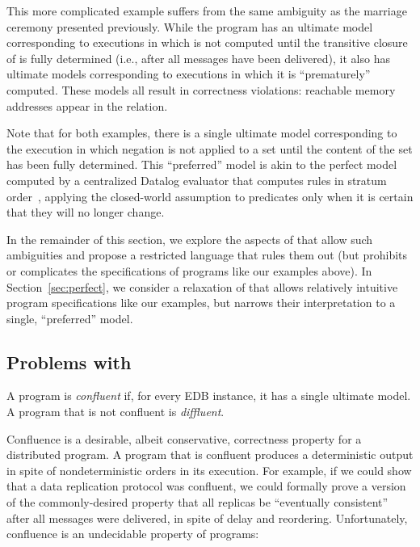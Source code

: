 This more complicated example suffers from the same ambiguity as the marriage
ceremony presented previously.  While the program has an ultimate model
corresponding to executions in which  is not computed until the
transitive closure of   is fully determined (i.e., after all
messages have been delivered), it also has ultimate models corresponding to executions in
which it is ``prematurely'' computed.  These models all result in correctness
violations: reachable memory addresses appear in the  relation.

Note that for both examples, there is a single ultimate model corresponding to
the execution in which negation is not applied to a set until the content of the
set has been fully determined.  This ``preferred'' model is akin to the perfect
model computed by a centralized Datalog evaluator that computes rules in stratum
order~\cite{ullmanbook}, applying the closed-world assumption to predicates only
when it is certain that they will no longer change.

In the remainder of this section, we explore the aspects of \lang that allow
such ambiguities and propose a restricted language \slang that rules them out
(but prohibits or complicates the specifications of programs like our examples above).  In
Section~\ref{sec:perfect}, we consider a relaxation of \slang that allows relatively intuitive program specifications like our examples, but narrows their interpretation to a
single, ``preferred'' model.

\subsection{Problems with \large \bf \lang}

\begin{definition}
  A \lang program is {\em confluent} if, for every EDB instance, it has a single ultimate model.  A program that is not confluent is {\em diffluent}.
\end{definition}


Confluence is a desirable, albeit conservative, correctness property for a distributed program.  A program that is
confluent produces a deterministic output in spite of nondeterministic orders in its execution.  For example, if
we could show that a data replication protocol was confluent, we could formally prove a version of the commonly-desired property that all replicas be ``eventually consistent''
after all messages were delivered, in spite of delay and reordering.
Unfortunately, confluence is an undecidable property of \lang programs:

